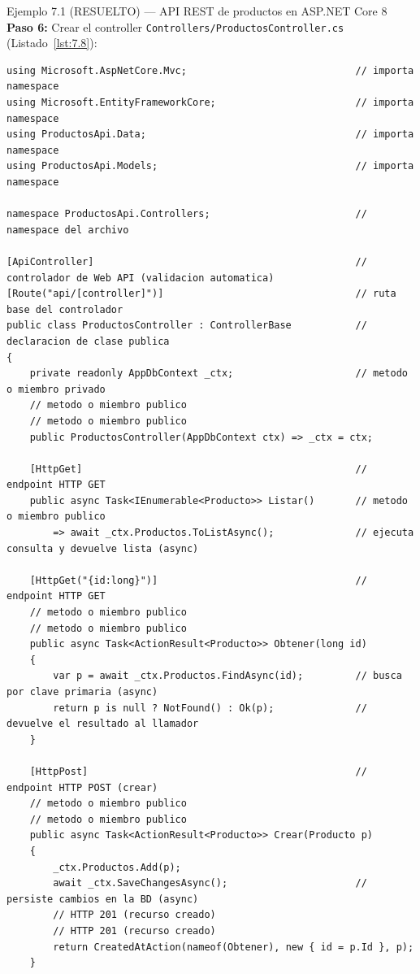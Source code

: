 \documentclass[11pt,a4paper,openany]{book}
\begin{document}
\begin{cajaejemplo}{Ejemplo 7.1 (RESUELTO) --- API REST de productos en ASP.NET Core 8}
\textbf{Paso 6:} Crear el controller \texttt{Controllers/ProductosController.cs} (Listado~\ref{lst:7.8}):

\begin{lstlisting}[style=cs,caption={ProductosController.cs},label=lst:7.8]
using Microsoft.AspNetCore.Mvc;                             // importa namespace
using Microsoft.EntityFrameworkCore;                        // importa namespace
using ProductosApi.Data;                                    // importa namespace
using ProductosApi.Models;                                  // importa namespace

namespace ProductosApi.Controllers;                         // namespace del archivo

[ApiController]                                             // controlador de Web API (validacion automatica)
[Route("api/[controller]")]                                 // ruta base del controlador
public class ProductosController : ControllerBase           // declaracion de clase publica
{
    private readonly AppDbContext _ctx;                     // metodo o miembro privado
    // metodo o miembro publico
    // metodo o miembro publico
    public ProductosController(AppDbContext ctx) => _ctx = ctx;

    [HttpGet]                                               // endpoint HTTP GET
    public async Task<IEnumerable<Producto>> Listar()       // metodo o miembro publico
        => await _ctx.Productos.ToListAsync();              // ejecuta consulta y devuelve lista (async)

    [HttpGet("{id:long}")]                                  // endpoint HTTP GET
    // metodo o miembro publico
    // metodo o miembro publico
    public async Task<ActionResult<Producto>> Obtener(long id)
    {
        var p = await _ctx.Productos.FindAsync(id);         // busca por clave primaria (async)
        return p is null ? NotFound() : Ok(p);              // devuelve el resultado al llamador
    }

    [HttpPost]                                              // endpoint HTTP POST (crear)
    // metodo o miembro publico
    // metodo o miembro publico
    public async Task<ActionResult<Producto>> Crear(Producto p)
    {
        _ctx.Productos.Add(p);
        await _ctx.SaveChangesAsync();                      // persiste cambios en la BD (async)
        // HTTP 201 (recurso creado)
        // HTTP 201 (recurso creado)
        return CreatedAtAction(nameof(Obtener), new { id = p.Id }, p);
    }


\end{lstlisting}
\end{cajaejemplo}
\end{document}
